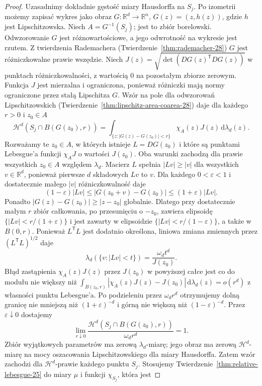 \begin{proof}
Uzasadnimy dokładnie gęstość miary Hausdorffa
na $S_j$. Po izometrii możemy zapisać wykres
jako obraz $G:\mathbb R^d\to\mathbb R^n$,
$G(z)=(z,h(z))$, gdzie $h$ jest Lipschitzowska.
Niech $A=G^{-1}(S_j)$; jest to zbiór borelowski.
Odwzorowanie $G$ jest różnowartościowe,
a jego odwrotność na wykresie jest rzutem.
Z twierdzenia Rademachera
(Twierdzenie~\ref{thm:rademacher-28})
$G$ jest różniczkowalne prawie wszędzie.
Niech $J(z)=\sqrt{\det(DG(z)^{\mathsf T}DG(z))}$
w punktach różniczkowalności, z wartością $0$
na pozostałym zbiorze zerowym.
Funkcja $J$ jest mierzalna i ograniczona, ponieważ
różniczki mają normy ograniczone przez stałą
Lipschitza $G$. Wzór na pole dla odwzorowań
Lipschitzowskich
(Twierdzenie~\ref{thm:lipschitz-area-coarea-28})
daje dla każdego $r>0$ i $z_0\in A$
\[
 \mathcal H^d(S_j\cap B(G(z_0),r))
 =\int_{\{z:|G(z)-G(z_0)|<r\}}\chi_A(z)J(z)
 \,\mathrm d\lambda_d(z).
\]
Rozważamy te $z_0\in A$, w których istnieje
$L=DG(z_0)$ i które są punktami Lebesgue'a
funkcji $\chi_A J$ o wartości $J(z_0)$.
Oba warunki zachodzą dla prawie wszystkich
$z_0\in A$ względem $\lambda_d$.
Macierz $L$ spełnia $|Lv|\ge|v|$ dla wszystkich
$v\in\mathbb R^d$, ponieważ pierwsze $d$
składowych $Lv$ to $v$.
Dla każdego $0<\varepsilon<1$ i dostatecznie
małego $|v|$ różniczkowalność daje
\[
 (1-\varepsilon)|Lv|
 \le |G(z_0+v)-G(z_0)|
 \le (1+\varepsilon)|Lv|.
\]
Ponadto $|G(z)-G(z_0)|\ge|z-z_0|$ globalnie.
Dlatego przy dostatecznie małym $r$
zbiór całkowania, po przesunięciu o $-z_0$,
zawiera elipsoidę $\{|Lv|<r/(1+\varepsilon)\}$
i jest zawarty w elipsoidzie
$\{|Lv|<r/(1-\varepsilon)\}$, a także w $B(0,r)$.
Ponieważ $L^{\mathsf T}L$ jest dodatnio określona,
liniowa zmiana zmiennych przez
$(L^{\mathsf T}L)^{1/2}$ daje
\[
 \lambda_d(\{v:|Lv|<t\})
 =\frac{\omega_d t^d}{J(z_0)}.
\]
Błąd zastąpienia $\chi_A(z)J(z)$ przez $J(z_0)$
w powyższej całce jest co do modułu nie większy
niż
$\int_{B(z_0,r)}|\chi_A(z)J(z)-J(z_0)|
\,\mathrm d\lambda_d(z)=o(r^d)$
z własności punktu Lebesgue'a.
Po podzieleniu przez $\omega_d r^d$ otrzymujemy
dolną granicę nie mniejszą niż $(1+\varepsilon)^{-d}$
i górną nie większą niż $(1-\varepsilon)^{-d}$.
Przez $\varepsilon\downarrow0$ dostajemy
\[
 \lim_{r\downarrow0}
 \frac{\mathcal H^d(S_j\cap B(G(z_0),r))}
 {\omega_d r^d}=1.
\]
Zbiór wyjątkowych parametrów ma zerową
$\lambda_d$-miarę; jego obraz ma zerową
$\mathcal H^d$-miarę na mocy oszacowania
Lipschitzowskiego dla miary Hausdorffa.
Zatem wzór zachodzi dla $\mathcal H^d$-prawie
każdego punktu $S_j$.
Stosujemy Twierdzenie~\ref{thm:relative-lebesgue-25}
do miary $\mu$ i funkcji $\chi_{S_j}$, która jest

\end{proof}
